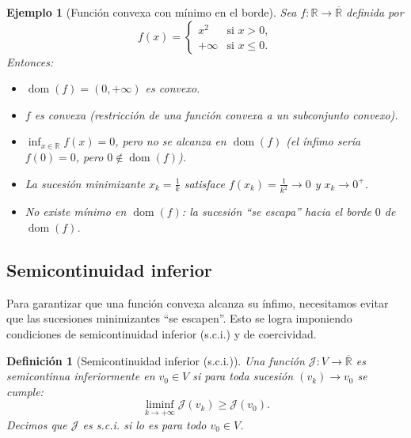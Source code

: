 \documentclass[12pt]{book}
\newtheorem{definition}{Definición}
\newtheorem{ex}{Ejemplo}
\newcommand{\dom}{\operatorname{dom}}
\theoremstyle{definition}
\theoremstyle{plain}
\theoremstyle{remark}
\begin{document}
\begin{ex}[Función convexa con mínimo en el borde]
    Sea $f: \mathbb{R} \to \overline{\mathbb{R}}$ definida por
    \[
    f(x) = \begin{cases}
        x^2 & \text{si } x > 0, \\
        +\infty & \text{si } x \leq 0.
    \end{cases}
    \]
    Entonces:
    \begin{itemize}
        \item $\dom(f) = (0, +\infty)$ es convexo.
        \item $f$ es convexa (restricción de una función convexa a un subconjunto convexo).
        \item $\inf_{x \in \mathbb{R}} f(x) = 0$, pero {no se alcanza} en $\dom(f)$ (el ínfimo sería $f(0) = 0$, pero $0 \notin \dom(f)$).
        \item La sucesión minimizante $x_k = \frac{1}{k}$ satisface $f(x_k) = \frac{1}{k^2} \to 0$ y $x_k \to 0^+$.
        \item {No existe mínimo en $\dom(f)$}: la sucesión ``se escapa'' hacia el borde $0$ de $\dom(f)$.
    \end{itemize}
\end{ex}

\subsection{Semicontinuidad inferior}

Para garantizar que una función convexa {alcanza su ínfimo}, necesitamos evitar que las sucesiones minimizantes ``se escapen''. Esto se logra imponiendo condiciones de {semicontinuidad inferior (s.c.i.)} y de {coercividad}.

\medskip
\begin{definition}[Semicontinuidad inferior (s.c.i.)]
    Una función $\mathcal{J}: V \to \overline{\mathbb{R}}$ es \emph{semicontinua inferiormente en $v_0 \in V$} si para toda sucesión $(v_k) \to v_0$ se cumple:
    \[
    \liminf_{k \to +\infty} \mathcal{J}(v_k) \geq \mathcal{J}(v_0).
    \]
    Decimos que $\mathcal{J}$ es {s.c.i.} si lo es para todo $v_0 \in V$.
\end{definition}
\end{document}
